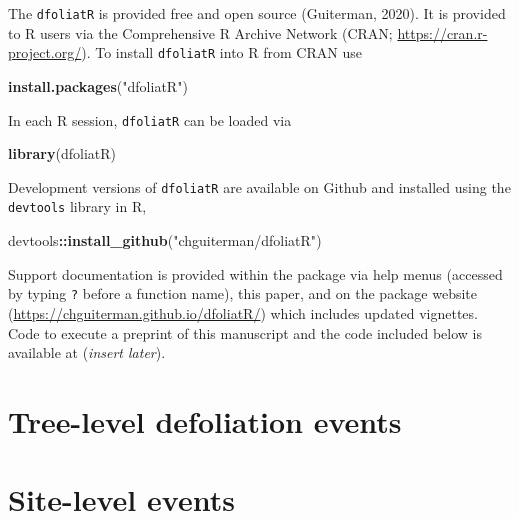 \documentclass[review]{elsarticle} %
\newenvironment{Shaded}{\begin{snugshade}}{\end{snugshade}}
\newcommand{\KeywordTok}[1]{\textcolor[rgb]{0.13,0.29,0.53}{\textbf{#1}}}
\newcommand{\NormalTok}[1]{#1}
\newcommand{\OperatorTok}[1]{\textcolor[rgb]{0.81,0.36,0.00}{\textbf{#1}}}
\newcommand{\StringTok}[1]{\textcolor[rgb]{0.31,0.60,0.02}{#1}}
\begin{document}
The \texttt{dfoliatR} is provided free and open source (Guiterman,
2020). It is provided to R users via the Comprehensive R Archive Network
(CRAN; \url{https://cran.r-project.org/}). To install \texttt{dfoliatR}
into R from CRAN use

\begin{Shaded}
\begin{Highlighting}[]
\KeywordTok{install.packages}\NormalTok{(}\StringTok{"dfoliatR"}\NormalTok{)}
\end{Highlighting}
\end{Shaded}

In each R session, \texttt{dfoliatR} can be loaded via

\begin{Shaded}
\begin{Highlighting}[]
\KeywordTok{library}\NormalTok{(dfoliatR)}
\end{Highlighting}
\end{Shaded}

Development versions of \texttt{dfoliatR} are available on Github and
installed using the \texttt{devtools} library in R,

\begin{Shaded}
\begin{Highlighting}[]
\NormalTok{devtools}\OperatorTok{::}\KeywordTok{install_github}\NormalTok{(}\StringTok{"chguiterman/dfoliatR"}\NormalTok{)}
\end{Highlighting}
\end{Shaded}

Support documentation is provided within the package via help menus
(accessed by typing \texttt{?} before a function name), this paper, and
on the package website (\url{https://chguiterman.github.io/dfoliatR/})
which includes updated vignettes. Code to execute a preprint of this
manuscript and the code included below is available at (\emph{insert
later}).

\hypertarget{tree-level-defoliation-events}{%
\section{Tree-level defoliation
events}\label{tree-level-defoliation-events}}

\hypertarget{site-level-events}{%
\section{Site-level events}\label{site-level-events}}
\end{document}
